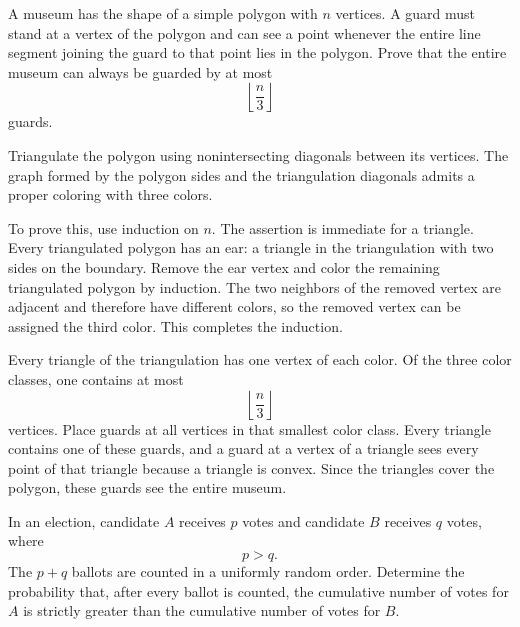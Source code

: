     \begin{expectedproblem}
        A museum has the shape of a simple polygon with $n$ vertices. A guard
        must stand at a vertex of the polygon and can see a point whenever the
        entire line segment joining the guard to that point lies in the
        polygon. Prove that the entire museum can always be guarded by at most
        \[
            \left\lfloor\frac{n}{3}\right\rfloor
        \]
        guards.
    \end{expectedproblem}

    \begin{solution}
        Triangulate the polygon using nonintersecting diagonals between its
        vertices. The graph formed by the polygon sides and the triangulation
        diagonals admits a proper coloring with three colors.

        To prove this, use induction on $n$. The assertion is immediate for a
        triangle. Every triangulated polygon has an ear: a triangle in the
        triangulation with two sides on the boundary. Remove the ear vertex and
        color the remaining triangulated polygon by induction. The two
        neighbors of the removed vertex are adjacent and therefore have
        different colors, so the removed vertex can be assigned the third
        color. This completes the induction.

        Every triangle of the triangulation has one vertex of each color. Of
        the three color classes, one contains at most
        \[
            \left\lfloor\frac{n}{3}\right\rfloor
        \]
        vertices. Place guards at all vertices in that smallest color class.
        Every triangle contains one of these guards, and a guard at a vertex of
        a triangle sees every point of that triangle because a triangle is
        convex. Since the triangles cover the polygon, these guards see the
        entire museum.
    \end{solution}

    \begin{expectedproblem}
        In an election, candidate $A$ receives $p$ votes and candidate $B$
        receives $q$ votes, where
        \[
            p>q.
        \]
        The $p+q$ ballots are counted in a uniformly random order. Determine
        the probability that, after every ballot is counted, the cumulative
        number of votes for $A$ is strictly greater than the cumulative number
        of votes for $B$.
    \end{expectedproblem}

